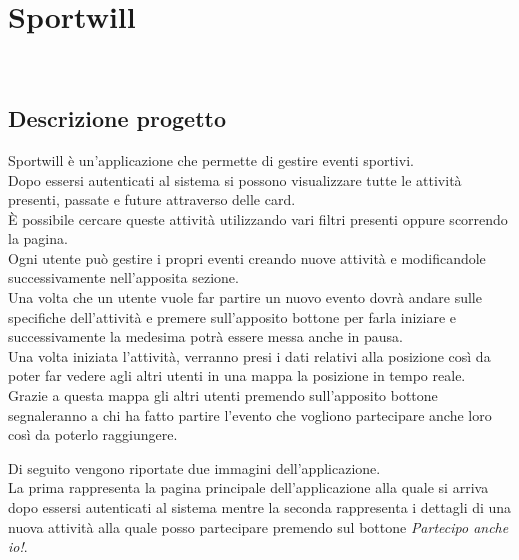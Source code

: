
\chapter{Sportwill}
\label{cap:Sportwill}

\\


\section{Descrizione progetto}
Sportwill è un'applicazione che permette di gestire eventi sportivi.\\
Dopo essersi autenticati al sistema si possono visualizzare tutte le attività presenti, passate e future attraverso delle card.\\
 È possibile cercare queste attività utilizzando vari filtri presenti oppure scorrendo la pagina.\\ 
 Ogni utente può gestire i propri eventi creando nuove attività e modificandole successivamente nell'apposita sezione.\\
 Una volta che un utente vuole far partire un nuovo evento dovrà andare sulle specifiche dell'attività e premere sull'apposito bottone per farla iniziare e successivamente la medesima potrà essere messa anche in pausa.\\
 Una volta iniziata l'attività, verranno presi i dati relativi alla posizione così da poter far vedere agli altri utenti in una mappa la posizione in tempo reale.\\
 Grazie a questa mappa gli altri utenti premendo sull'apposito bottone segnaleranno a chi ha fatto partire l'evento che vogliono partecipare anche loro così da poterlo raggiungere.
 
 \newpage
 
 Di seguito vengono riportate due immagini dell'applicazione.\\
 La prima rappresenta la pagina principale dell'applicazione alla quale si arriva dopo essersi autenticati al sistema mentre la seconda rappresenta i dettagli di una nuova attività alla quale posso partecipare premendo sul bottone \textit{Partecipo anche io!}.\\
 
